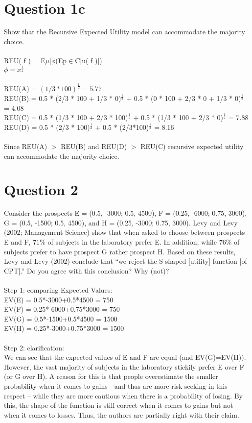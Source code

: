 \documentclass[12pt]{article}
\begin{document}
\section*{Question 1c}
Show that the Recursive Expected Utility model can accommodate the majority choice.\\\\ REU( f ) = E$\mu$[$\phi$(Ep$\in$C[u( f )])]\\
$\phi= x^\frac{1}{2}$\\\\
REU(A) = $(1/3 * 100)^\frac{1}{2} = 5.77$\\
REU(B) = 0.5 * (2/3 * 100 + 1/3 * 0)$^\frac{1}{2}$ + 0.5 * (0 * 100 + 2/3 * 0 + 1/3 * 0)$^\frac{1}{2}$ = 4.08\\
REU(C) = 0.5 * (1/3 * 100 + 2/3 * 100)$^\frac{1}{2}$ + 0.5 * (1/3 * 100 + 2/3 * 0)$^\frac{1}{2}$ = 7.88\\
REU(D) = 0.5 * (2/3 * 100)$^\frac{1}{2}$ + 0.5 * (2/3*100)$^\frac{1}{2}$ = 8.16\\\\
Since REU(A) $>$ REU(B) and REU(D) $>$ REU(C) recursive expected utility can accommodate the majority choice.

\section*{Question 2}

Consider the prospects E = (0.5, -3000; 0.5, 4500), F = (0.25, -6000; 0.75, 3000), G = (0.5, -1500; 0.5, 4500), and H = (0.25, -3000; 0.75, 3000). Levy and Levy (2002; Management Science) show that when asked to choose between prospects E and F, $71\%$ of subjects in the laboratory prefer E. In addition, while $76\%$ of subjects prefer to have prospect G rather prospect H. Based on these results, Levy and Levy (2002) conclude that “we reject the S-shaped [utility] function [of CPT].” Do you agree with this conclusion? Why (not)?\\\\
Step 1: comparing Expected Values:\\
EV(E) = 0.5*-3000+0.5*4500 = 750\\
EV(F) = 0.25*-6000+0.75*3000 = 750\\
EV(G) = 0.5*-1500+0.5*4500 = 1500\\
EV(H) = 0.25*-3000+0.75*3000 = 1500\\\\
Step 2: clarification:\\
We can see that the expected values of E and F are equal (and EV(G)=EV(H)). However, the vast majority of subjects in the laboratory stickily prefer E over F (or G over H). A reason for this is that people overestimate the smaller probability when it comes to gains - and thus are more risk seeking in this respect – while they are more cautious when there is a probability of losing. By this, the shape of the function is still correct when it comes to gains but not when it comes to losses. Thus, the authors are partially right with their claim.
\end{document}

